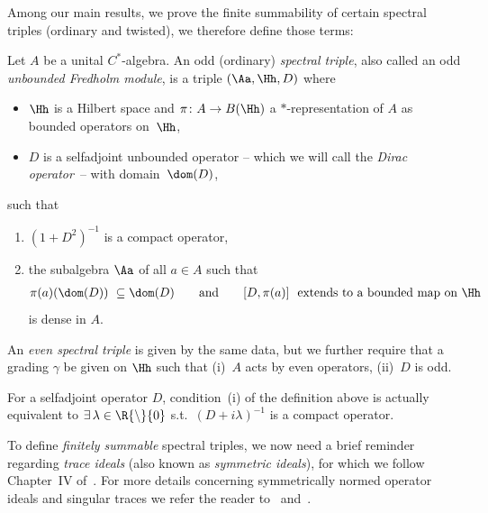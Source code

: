 Among our main results, we prove the f\/inite summability of certain spectral triples (ordinary and twisted), we therefore def\/ine those terms:
\begin{Definition}
\label{Def:TrSp}
Let $A$ be a unital $C^*$-algebra. An odd (ordinary) \emph{spectral triple}, also called an odd \emph{unbounded Fredholm module}, is a triple $(\Aa, \Hh, D)$ where
\begin{itemize}\itemsep=0pt
\item
$\Hh$ is a Hilbert space and $\pi \colon A\to B(\Hh)$ a $*$-representation of $A$ as bounded operators on~$\Hh$,
\item
$D$ is a selfadjoint unbounded operator -- which we will call the \emph{Dirac operator}~-- with domain~$\dom(D)$,
\end{itemize}
such that
\begin{enumerate}\itemsep=0pt
\item[(i)]
$(1+D^2)^{-1}$ is a compact operator,
\item[(ii)]
the subalgebra $\Aa$ of all $a\in A$ such that
\begin{gather*}
\pi(a) (\dom(D)) \ \subseteq \dom(D)
\qquad
 \text{and}
\qquad
[D,\pi(a)] \ \text{ extends to a bounded map on }\Hh
\end{gather*}
is dense in $A$.
\end{enumerate}
An \emph{even spectral triple} is given by the same data, but we further require that a grading $\gamma$ be given on $\Hh$ such that (i)~$A$ acts by even operators, (ii)~$D$ is odd.
\end{Definition}

\begin{Remark}
\label{Rk:SymmIdeals}
For a selfadjoint operator $D$, condition~(i) %
of the def\/inition above is actually equivalent to $\exists\, \lambda \in \R {\setminus} \{ 0 \}$ s.t.\ $(D+i \lambda)^{-1}$ is a compact operator.
\end{Remark}

To def\/ine \emph{finitely summable} spectral triples, we now need a brief reminder regarding \emph{trace ideals} (also known as \emph{symmetric ideals}), for which we follow Chapter~IV of~\cite{NCG}.
For more details concerning symmetrically normed operator ideals and singular traces we refer the reader to~\cite{TraceIdealsSimon} and~\cite{SingularTracesLSZ}.

